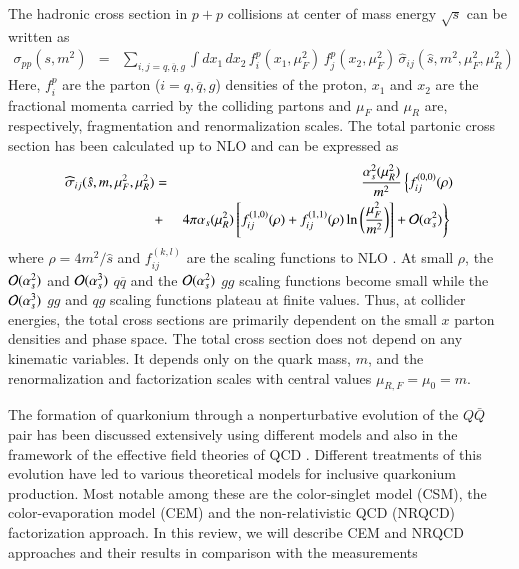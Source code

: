The hadronic cross section in $p+p$ collisions at center of mass energy
$\sqrt{s}$ can be written as
\begin{eqnarray}
\sigma_{pp}(s,m^2) & = & \sum_{i,j = q, \overline q, g} 
\int dx_1 \, dx_2 \, 
f_i^p (x_1,\mu_F^2) \,
f_j^p(x_2,\mu_F^2) \, \widehat{\sigma}_{ij}(\hat{s},m^2,\mu_F^2,\mu_R^2)
\label{sigpp}
\end{eqnarray}
Here, $f_i^p$ are the parton (${i = q, \overline q, g}$) densities of the proton,
$x_1$ and $x_2$ are the fractional momenta carried by the colliding
partons and $\mu_F$ and $\mu_R$ are, respectively, fragmentation and renormalization scales. 
The total partonic cross section has been calculated up to NLO
\cite{Nason:1989zy,Nason:1987xz} and can be expressed as
\begin{eqnarray}
\widehat{\sigma}_{ij}(\hat{s},m,\mu_F^2,\mu_R^2) & = & 
\frac{\alpha_s^2(\mu_R^2)}{m^2}
\left\{ f^{(0,0)}_{ij}(\rho) \right. \nonumber \\
 & + & \left. 4\pi \alpha_s(\mu_R^2) \left[f^{(1,0)}_{ij}(\rho) + 
f^{(1,1)}_{ij}(\rho)\ln\bigg(\frac{\mu_F^2}{m^2} \bigg) \right] 
+ {\cal O}(\alpha_s^2) \right\}
\,\, 
\label{sigpart}
\end{eqnarray}
where $\rho = 4m^2/\hat{s}$ and 
$f_{ij}^{(k,l)}$ are the scaling functions to NLO \cite{Nason:1989zy,Nason:1987xz}. 
At small $\rho$, the ${\cal O}(\alpha_s^2)$ and ${\cal O}(\alpha_s^3)$
$q \overline q$ and the ${\cal O}(\alpha_s^2)$ $gg$ scaling functions 
become small while the ${\cal O}(\alpha_s^3)$ $gg$ and $qg$ scaling functions
plateau at finite values.  Thus, at collider energies, the total cross sections
are primarily dependent on the small $x$ parton densities and phase space.
The total cross section does not depend on any kinematic variables. It depends  
only on the quark mass, $m$, and the renormalization and factorization scales with central
values $\mu_{R,F} =\mu_0 = m$.


The formation of quarkonium through a nonperturbative evolution of the $Q\bar Q$ pair 
has been discussed extensively using different models and also in the framework of the 
  effective field theories of QCD
\cite{Bodwin:1994jh,Brambilla:2004wf}. Different
treatments of this evolution have led to various theoretical models for
inclusive quarkonium production. Most notable among these are the color-singlet
model (CSM), the color-evaporation model (CEM) and the non-relativistic QCD
(NRQCD) factorization approach. In this review, we will describe CEM and NRQCD 
approaches and their results in comparison with the measurements 




